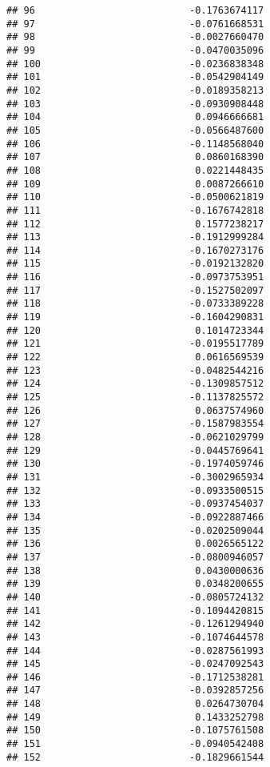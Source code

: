 \documentclass[
]{article}
\begin{document}
\begin{verbatim}
## 96                           -0.1763674117
## 97                           -0.0761668531
## 98                           -0.0027660470
## 99                           -0.0470035096
## 100                          -0.0236838348
## 101                          -0.0542904149
## 102                          -0.0189358213
## 103                          -0.0930908448
## 104                           0.0946666681
## 105                          -0.0566487600
## 106                          -0.1148568040
## 107                           0.0860168390
## 108                           0.0221448435
## 109                           0.0087266610
## 110                          -0.0500621819
## 111                          -0.1676742818
## 112                           0.1577238217
## 113                          -0.1912999284
## 114                          -0.1670273176
## 115                          -0.0192132820
## 116                          -0.0973753951
## 117                          -0.1527502097
## 118                          -0.0733389228
## 119                          -0.1604290831
## 120                           0.1014723344
## 121                          -0.0195517789
## 122                           0.0616569539
## 123                          -0.0482544216
## 124                          -0.1309857512
## 125                          -0.1137825572
## 126                           0.0637574960
## 127                          -0.1587983554
## 128                          -0.0621029799
## 129                          -0.0445769641
## 130                          -0.1974059746
## 131                          -0.3002965934
## 132                          -0.0933500515
## 133                          -0.0937454037
## 134                          -0.0922887466
## 135                          -0.0202509044
## 136                           0.0026565122
## 137                          -0.0800946057
## 138                           0.0430000636
## 139                           0.0348200655
## 140                          -0.0805724132
## 141                          -0.1094420815
## 142                          -0.1261294940
## 143                          -0.1074644578
## 144                          -0.0287561993
## 145                          -0.0247092543
## 146                          -0.1712538281
## 147                          -0.0392857256
## 148                           0.0264730704
## 149                           0.1433252798
## 150                          -0.1075761508
## 151                          -0.0940542408
## 152                          -0.1829661544

\end{verbatim}
\end{document}
